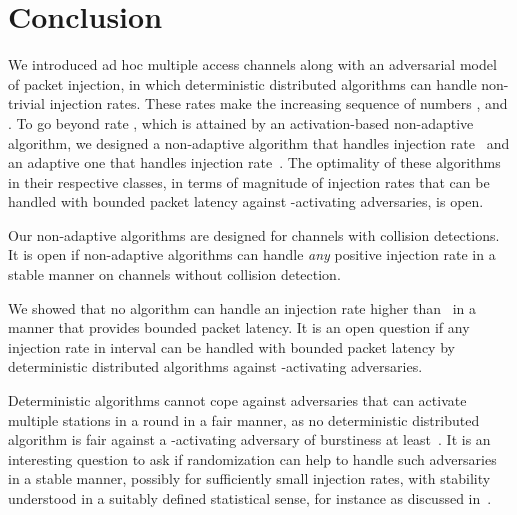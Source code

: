 \documentclass[11pt]{article}
\begin{document}
\section{Conclusion}



We introduced ad hoc multiple access channels along with an adversarial model of packet injection,  in which deterministic distributed algorithms can handle non-trivial injection rates.
These rates make the increasing sequence of numbers ,  and .
To go beyond rate , which is attained by an activation-based non-adaptive algorithm, we designed a non-adaptive algorithm that handles injection rate~ and an adaptive one  that handles injection rate~.
The optimality of these algorithms in their respective classes, in terms of magnitude of injection rates  that can be  handled with bounded packet latency against -activating adversaries, is open.

Our non-adaptive algorithms are designed for channels with collision detections.
It is open if non-adaptive algorithms can handle \emph{any} positive injection rate in a stable manner on channels without collision detection.

We showed that no algorithm can handle an injection rate higher than~ in a manner that provides bounded packet latency.
It is an open question if any injection rate in interval  can be handled with bounded packet latency by deterministic distributed algorithms against -activating adversaries.

Deterministic algorithms cannot cope against adversaries that can activate multiple stations in a round in a fair manner, as no deterministic distributed algorithm is fair against a -activating adversary of burstiness at least~.
It is an interesting question to ask if randomization can help to handle such adversaries in a stable manner, possibly for sufficiently small injection rates, with stability understood in a suitably defined statistical sense,  for instance as discussed in~\cite{Chlebus-randomized-radio-chapter-2001}.

\pagebreak






\end{document}
